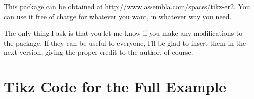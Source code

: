 \documentclass[12pt]{article}
\begin{document}
This package can be obtained at
\url{http://www.assembla.com/spaces/tikz-er2}. You can use it
free of charge for whatever you want, in whatever way you need.

The only thing I ask is that you let me know if you make any modifications to
the package. If they can be useful to everyone, I'll be glad to insert them in
the next version, giving the proper credit to the author, of course.

\newpage

\appendix

\section{Tikz Code for the Full Example}
\label{sec:tikz-code-full}


\end{document}
